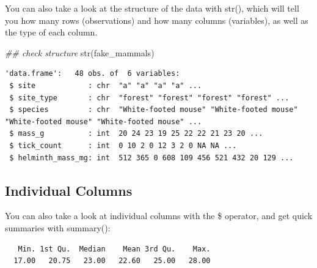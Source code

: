 \documentclass[
  letterpaper,
  DIV=11,
  numbers=noendperiod]{scrreprt}
\newenvironment{Shaded}{\begin{snugshade}}{\end{snugshade}}
\newcommand{\DocumentationTok}[1]{\textcolor[rgb]{0.37,0.37,0.37}{\textit{#1}}}
\newcommand{\FunctionTok}[1]{\textcolor[rgb]{0.28,0.35,0.67}{#1}}
\newcommand{\NormalTok}[1]{\textcolor[rgb]{0.00,0.23,0.31}{#1}}
\newcommand{\SpecialCharTok}[1]{\textcolor[rgb]{0.37,0.37,0.37}{#1}}
\begin{document}
You can also take a look at the structure of the data with str(), which
will tell you how many rows (observations) and how many columns
(variables), as well as the type of each column.

\begin{Shaded}
\begin{Highlighting}[]
\DocumentationTok{\#\# check structure}
\FunctionTok{str}\NormalTok{(fake\_mammals)}
\end{Highlighting}
\end{Shaded}

\begin{verbatim}
'data.frame':   48 obs. of  6 variables:
 $ site            : chr  "a" "a" "a" "a" ...
 $ site_type       : chr  "forest" "forest" "forest" "forest" ...
 $ species         : chr  "White-footed mouse" "White-footed mouse" "White-footed mouse" "White-footed mouse" ...
 $ mass_g          : int  20 24 23 19 25 22 22 21 23 20 ...
 $ tick_count      : int  0 10 2 0 12 3 2 0 NA NA ...
 $ helminth_mass_mg: int  512 365 0 608 109 456 521 432 20 129 ...
\end{verbatim}

\subsection{Individual Columns}\label{individual-columns}

You can also take a look at individual columns with the \$ operator, and
get quick summaries with summary():

\begin{Shaded}
\end{Shaded}

\begin{verbatim}
   Min. 1st Qu.  Median    Mean 3rd Qu.    Max. 
  17.00   20.75   23.00   22.60   25.00   28.00 
\end{verbatim}

\begin{Shaded}
\end{Shaded}
\end{document}
